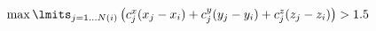 \documentclass{minimal}
\begin{document}
 $
\max \lmits_{j=1...N(i)}\left( c_j^x (x_j-x_i) + c_j^y (y_j-y_i) + c_j^z (z_j-z_i) \right) > 1.5
 $
 
\end{document}
